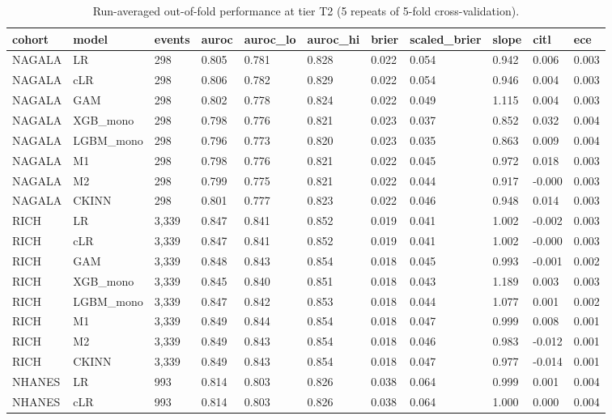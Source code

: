 \begin{table}[ht]
\centering
\scriptsize
\caption{Run-averaged out-of-fold performance at tier T2 (5 repeats of 5-fold cross-validation).}
\label{tab:perf}
\begin{tabular}{lllllllllll}
\toprule
cohort & model & events & auroc & auroc\_lo & auroc\_hi & brier & scaled\_brier & slope & citl & ece \\
\midrule
NAGALA & LR & 298 & 0.805 & 0.781 & 0.828 & 0.022 & 0.054 & 0.942 & 0.006 & 0.003 \\
NAGALA & cLR & 298 & 0.806 & 0.782 & 0.829 & 0.022 & 0.054 & 0.946 & 0.004 & 0.003 \\
NAGALA & GAM & 298 & 0.802 & 0.778 & 0.824 & 0.022 & 0.049 & 1.115 & 0.004 & 0.003 \\
NAGALA & XGB\_mono & 298 & 0.798 & 0.776 & 0.821 & 0.023 & 0.037 & 0.852 & 0.032 & 0.004 \\
NAGALA & LGBM\_mono & 298 & 0.796 & 0.773 & 0.820 & 0.023 & 0.035 & 0.863 & 0.009 & 0.004 \\
NAGALA & M1 & 298 & 0.798 & 0.776 & 0.821 & 0.022 & 0.045 & 0.972 & 0.018 & 0.003 \\
NAGALA & M2 & 298 & 0.799 & 0.775 & 0.821 & 0.022 & 0.044 & 0.917 & -0.000 & 0.003 \\
NAGALA & CKINN & 298 & 0.801 & 0.777 & 0.823 & 0.022 & 0.046 & 0.948 & 0.014 & 0.003 \\
RICH & LR & 3,339 & 0.847 & 0.841 & 0.852 & 0.019 & 0.041 & 1.002 & -0.002 & 0.003 \\
RICH & cLR & 3,339 & 0.847 & 0.841 & 0.852 & 0.019 & 0.041 & 1.002 & -0.000 & 0.003 \\
RICH & GAM & 3,339 & 0.848 & 0.843 & 0.854 & 0.018 & 0.045 & 0.993 & -0.001 & 0.002 \\
RICH & XGB\_mono & 3,339 & 0.845 & 0.840 & 0.851 & 0.018 & 0.043 & 1.189 & 0.003 & 0.003 \\
RICH & LGBM\_mono & 3,339 & 0.847 & 0.842 & 0.853 & 0.018 & 0.044 & 1.077 & 0.001 & 0.002 \\
RICH & M1 & 3,339 & 0.849 & 0.844 & 0.854 & 0.018 & 0.047 & 0.999 & 0.008 & 0.001 \\
RICH & M2 & 3,339 & 0.849 & 0.843 & 0.854 & 0.018 & 0.046 & 0.983 & -0.012 & 0.001 \\
RICH & CKINN & 3,339 & 0.849 & 0.843 & 0.854 & 0.018 & 0.047 & 0.977 & -0.014 & 0.001 \\
NHANES & LR & 993 & 0.814 & 0.803 & 0.826 & 0.038 & 0.064 & 0.999 & 0.001 & 0.004 \\
NHANES & cLR & 993 & 0.814 & 0.803 & 0.826 & 0.038 & 0.064 & 1.000 & 0.000 & 0.004 \\

\end{tabular}
\end{table}
